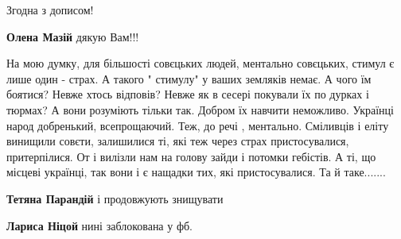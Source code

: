 \begin{itemize}
Згодна з дописом!

\begin{itemize}
 
\textbf{Олена Мазій} дякую Вам!!!
\end{itemize}

 

На мою думку, для більшості совєцьких людей, ментально совєцьких, стимул є лише
один - страх. А такого " стимулу" у ваших земляків немає. А чого їм боятися?
Невже хтось відповів? Невже як в сесері покували їх по дурках і тюрмах? А вони
розуміють тільки так. Добром їх навчити неможливо. Українці народ добренький,
всепрощаючий. Теж, до речі , ментально. Сміливців і еліту винищили совєти,
залишилися ті, які теж через страх пристосувалися, притерпілися. От і вилізли
нам на голову зайди і потомки гебістів. А ті, що місцеві українці, так вони і є
нащадки тих, які пристосувалися. Та й таке.......

\begin{itemize}
 
\textbf{Тетяна Парандій} і продовжують знищувати
\end{itemize}

 
\textbf{Лариса Ніцой} нині заблокована у фб.

\begin{itemize}
 

\end{itemize}
\end{itemize}
